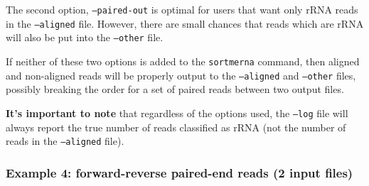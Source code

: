 \documentclass[10pt,a4paper]{article}
\begin{document}
The second option, {\tt--paired-out} is optimal for users that want only rRNA reads in the
{\tt--aligned} file. However, there are small chances that reads which are rRNA will also be
put into the {\tt--other} file.

If neither of these two options is added to the {\tt sortmerna} command, then aligned and
non-aligned reads will be properly output to the {\tt--aligned} and {\tt--other} files, possibly breaking
the order for a set of paired reads between two output files.

{\bf It's important to note} that regardless of the options used, the {\tt--log} file will always
report the true number of reads classified as rRNA (not the number of reads in the {\tt--aligned}
file).

\subsubsection{Example 4: forward-reverse paired-end reads (2 input files)}
\end{document}
